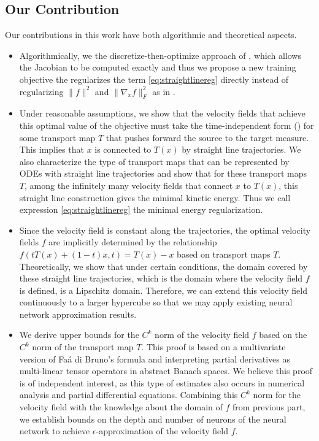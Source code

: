 \subsection{Our Contribution}
Our contributions in this work have both algorithmic and theoretical aspects.
\begin{itemize}
    \item Algorithmically, we  the discretize-then-optimize approach of \cite{OTFlow}, which allows the Jacobian to be computed exactly and thus we propose a new training objective the regularizes the term \ref{eq:straightlinereg} directly instead of regularizing $\|f\|^2$ and $\|\nabla_xf\|^2_F$ as in \cite{HowToTrain}. 
    
    \item Under reasonable assumptions, we show that the velocity fields that achieve this optimal value of the objective must take the time-independent form ()  for some transport map $T$ that pushes forward the source to the target measure. This implies that $x$ is connected to $T(x)$ by straight line trajectories. We also characterize the type of transport maps that can be represented by ODEs with straight line trajectories and show that for these transport maps $T$, among the infinitely many velocity fields that connect $x$ to $T(x)$, this straight line construction gives the minimal kinetic energy. Thus we call expression \eqref{eq:straightlinereg} the minimal energy regularization. 
    
    \item Since the velocity field is constant along the trajectories, the optimal velocity fields $f$ are implicitly determined by the relationship $f(tT(x) + (1-t)x, t) = T(x) - x$ based on transport maps $T$. Theoretically, we show that under certain conditions, the domain covered by these straight line trajectories, which is the domain where the velocity field $f$ is defined, is a Lipschitz domain. Therefore, we can extend this velocity field continuously to a larger hypercube so that we may apply existing neural network approximation results. 
    
    \item We derive upper bounds for the $C^k$ norm of the velocity field $f$ based on the $C^k$ norm of the transport map $T$. This proof is based on a multivariate version of Fa\'{a} di Bruno's formula and interpreting partial derivatives as multi-linear tensor operators in abstract Banach spaces. We believe this proof is of independent interest, as this type of estimates also occurs in numerical analysis and partial differential equations. Combining this $C^k$ norm for the velocity field with the knowledge about the domain of $f$ from previous part, we establish bounds on the depth and number of neurons of the neural network to achieve $\epsilon$-approximation of the velocity field $f$. 
    

\end{itemize}

